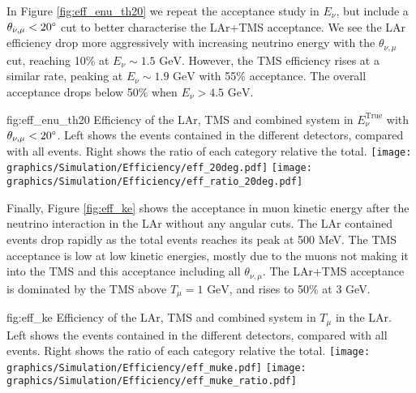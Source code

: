 In Figure \ref{fig:eff_enu_th20} we repeat the acceptance study in $E_\nu$, but include a $\theta_{\nu,\mu}<20\degree$ cut to better characterise the LAr+TMS acceptance. We see the LAr efficiency drop more aggressively with increasing neutrino energy with the $\theta_{\nu,\mu}$ cut, reaching 10\% at $E_\nu\sim 1.5\text{ GeV}$. However, the TMS efficiency rises at a similar rate, peaking at $E_\nu\sim1.9\text{ GeV}$ with 55\% acceptance. The overall acceptance drops below 50\% when $E_\nu>4.5\text{ GeV}$.
\begin{dunefigure}[]{fig:eff_enu_th20}
{Efficiency of the LAr, TMS and combined system in $E_\nu^\text{True}$ with $\theta_{\nu,\mu}<20\degree$. Left shows the events contained in the different detectors, compared with all events. Right shows the ratio of each category relative the total.}
\texttt{[image: graphics/Simulation/Efficiency/eff\_20deg.pdf]} \texttt{[image: graphics/Simulation/Efficiency/eff\_ratio\_20deg.pdf]}
\end{dunefigure}

Finally, Figure \ref{fig:eff_ke} shows the acceptance in muon kinetic energy after the neutrino interaction in the LAr without any angular cuts. The LAr contained events drop rapidly as the total events reaches its peak at 500 MeV. The TMS acceptance is low at low kinetic energies, mostly due to the muons not making it into the TMS and this acceptance including all $\theta_{\nu,\mu}$. The LAr+TMS acceptance is dominated by the TMS above $T_\mu=1\text{ GeV}$, and rises to 50\% at 3 GeV. 
\begin{dunefigure}[]{fig:eff_ke}
{Efficiency of the LAr, TMS and combined system in $T_\mu$ in the LAr. Left shows the events contained in the different detectors, compared with all events. Right shows the ratio of each category relative the total.}
\texttt{[image: graphics/Simulation/Efficiency/eff\_muke.pdf]} \texttt{[image: graphics/Simulation/Efficiency/eff\_muke\_ratio.pdf]}
\end{dunefigure}

